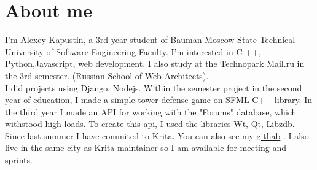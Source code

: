 \documentclass[]{article}
\begin{document}
\section{About me}
I'm Alexey Kapustin, a 3rd year student of Bauman Moscow State Technical University of Software Engineering 
Faculty. I'm interested in C ++, Python,Javascript, web development. I also study at the Technopark Mail.ru in the 3rd semester. (Russian School of Web Architects).
\\ 
I did projects using Django, Nodejs.
Within the semester project in the second year of education, I made a simple tower-defense game on SFML C++ library. In the third year I made an API for working with the "Forums" database, which withstood high loads. To create this api, I used the libraries Wt, Qt, Libzdb.
 Since last summer I have commited  to Krita. You can also see my \href{https://github.com/akapust1n}{githab} . I also live in the same city as Krita maintainer so I am available for meeting
 and sprints.




\end{document}
